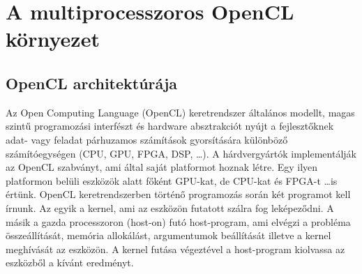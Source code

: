 \chapter{A multiprocesszoros OpenCL környezet}

\section{OpenCL architektúrája}
	Az Open Computing Language (OpenCL) keretrendszer \cite{opencl}
	általános modellt, magas szintű programozási interfészt és hardware
	absztrakciót nyújt a fejlesztőknek adat- vagy feladat párhuzamos számítások gyorsítására különböző
	számítóegységen (CPU, GPU, FPGA, DSP, \ldots).
	A hárdvergyártók implementálják az OpenCL szabványt, ami által saját platformot
	hoznak létre. Egy ilyen platformon belüli eszközök alatt főként GPU-kat, de
	CPU-kat és FPGA-t \ldots is értünk.
	OpenCL keretrendszerben történő programozás során két programot kell írnunk.
	Az egyik a kernel, ami az eszközön futatott szálra fog leképeződni.
	A másik a gazda processzoron (host-on) futó host-program, ami elvégzi a
	probléma összeállítását, memória allokálást, argumentumok beállítását
	illetve a kernel meghívását az eszközön.
	A kernel futása végeztével a host-program kiolvassa az eszközből
	a kívánt eredményt.
	
